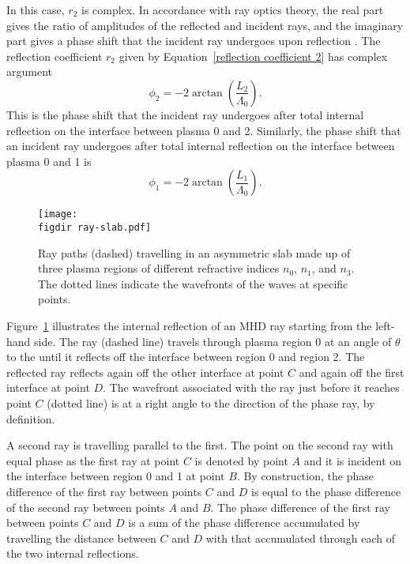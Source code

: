 \documentclass[12pt]{../style-files/ociamthesis}
\begin{document}
	In this case, $r_2$ is complex. In accordance with ray optics theory, the real part gives the ratio of amplitudes of the reflected and incident rays, and the imaginary part gives a phase shift that the incident ray undergoes upon reflection \citep{bor_etal99}. The reflection coefficient $r_2$ given by Equation~\eqref{reflection coefficient 2} has complex argument
	\begin{equation}
	\phi_2 = -2 \arctan\left(\frac{L_2}{\Lambda_0}\right).
	\end{equation}
	This is the phase shift that the incident ray undergoes after total internal reflection on the interface between plasma 0 and 2. Similarly, the phase shift that an incident ray undergoes after total internal reflection on the interface between plasma 0 and 1 is
	\begin{equation}
	\phi_1 = -2 \arctan\left(\frac{L_1}{\Lambda_0}\right).
	\end{equation}
	
	\begin{figure}
		\centering
		\texttt{[image: \\figdir ray-slab.pdf]}
		\caption{Ray paths (dashed) travelling in an asymmetric slab made up of three plasma regions of different refractive indices $n_0$, $n_1$, and $n_3$. The dotted lines indicate the wavefronts of the waves at specific points.}
		\label{fig: ray slab}
	\end{figure}
	Figure~\ref{fig: ray slab} illustrates the internal reflection of an MHD ray starting from the left-hand side. The ray (dashed line) travels through plasma region 0 at an angle of $\theta$ to the until it reflects off the interface between region 0 and region 2. The reflected ray reflects again off the other interface at point $C$ and again off the first interface at point $D$. The wavefront associated with the ray just before it reaches point $C$ (dotted line) is at a right angle to the direction of the phase ray, by definition.
	
	A second ray is travelling parallel to the first. The point on the second ray with equal phase as the first ray at point $C$ is denoted by point $A$ and it is incident on the interface between region 0 and 1 at point $B$. By construction, the phase difference of the first ray between points $C$ and $D$ is equal to the phase difference of the second ray between points $A$ and $B$. The phase difference of the first ray between points $C$ and $D$ is a sum of the phase difference accumulated by travelling the distance between $C$ and $D$ with that accumulated through each of the two internal reflections.
	
\end{document}

